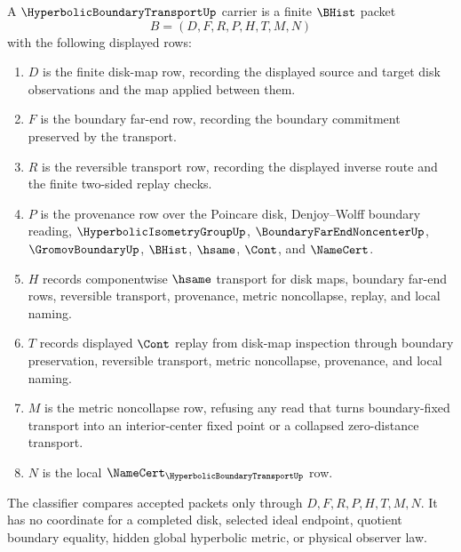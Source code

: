 \begin{definition}
\label{def:hyperbolic-boundary-transport-carrier}
A $\HyperbolicBoundaryTransportUp$ carrier is a finite $\BHist$ packet
$$
B=(D,F,R,P,H,T,M,N)
$$
with the following displayed rows:
\begin{enumerate}
\item $D$ is the finite disk-map row, recording the displayed source and target disk observations and the map applied between them.
\item $F$ is the boundary far-end row, recording the boundary commitment preserved by the transport.
\item $R$ is the reversible transport row, recording the displayed inverse route and the finite two-sided replay checks.
\item $P$ is the provenance row over the Poincare disk, Denjoy--Wolff boundary reading, $\HyperbolicIsometryGroupUp$, $\BoundaryFarEndNoncenterUp$, $\GromovBoundaryUp$, $\BHist$, $\hsame$, $\Cont$, and $\NameCert$.
\item $H$ records componentwise $\hsame$ transport for disk maps, boundary far-end rows, reversible transport, provenance, metric noncollapse, replay, and local naming.
\item $T$ records displayed $\Cont$ replay from disk-map inspection through boundary preservation, reversible transport, metric noncollapse, provenance, and local naming.
\item $M$ is the metric noncollapse row, refusing any read that turns boundary-fixed transport into an interior-center fixed point or a collapsed zero-distance transport.
\item $N$ is the local $\NameCert_{\HyperbolicBoundaryTransportUp}$ row.
\end{enumerate}
The classifier compares accepted packets only through $D,F,R,P,H,T,M,N$. It has no coordinate for a completed disk, selected ideal endpoint, quotient boundary equality, hidden global hyperbolic metric, or physical observer law.
\end{definition}

